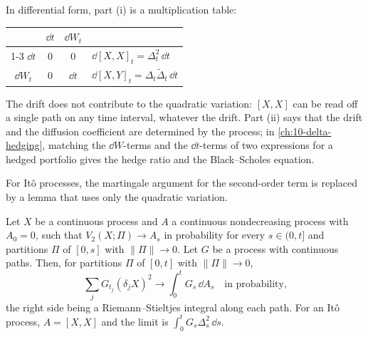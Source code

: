 In differential form, part (i) is a multiplication table:
\begin{center}
\begin{tabular}{@{}c|cc@{\qquad}l@{}}
  & $\dd t$ & $\dd W_t$ & \\ \cline{1-3}
  $\dd t$ & $0$ & $0$ & $\dd[X,X]_t=\Delta_t^2\,\dd t$\\
  $\dd W_t$ & $0$ & $\dd t$ & $\dd[X,Y]_t=\Delta_t\tilde\Delta_t\,\dd t$
\end{tabular}
\end{center}
The drift does not contribute to the quadratic variation: $[X,X]$ can be read off a single path on
any time interval, whatever the drift. Part (ii) says that the drift and the diffusion coefficient
are determined by the process; in \cref{ch:10-delta-hedging}, matching the $\dd W$-terms and the
$\dd t$-terms of two expressions for a hedged portfolio gives the hedge ratio and the Black--Scholes
equation.

For It\^o processes, the martingale argument for the second-order term is replaced by a lemma
that uses only the quadratic variation.

\begin{lemma}\label{lem:itf-weighted}
Let $X$ be a continuous process and $A$ a continuous nondecreasing process with $A_0=0$, such that
$V_2(X;\Pi)\to A_s$ in probability for every $s\in(0,t]$ and partitions $\Pi$ of $[0,s]$ with
$\|\Pi\|\to0$. Let $G$ be a process with continuous paths. Then, for partitions $\Pi$ of $[0,t]$ with
$\|\Pi\|\to0$,
\[
  \sum_jG_{t_j}(\delta_jX)^2\longrightarrow\int_0^tG_s\,\dd A_s\quad\text{in probability,}
\]
the right side being a Riemann--Stieltjes integral along each path. For an It\^o process,
$A=[X,X]$ and the limit is $\int_0^tG_s\Delta_s^2\,\dd s$.
\end{lemma}

